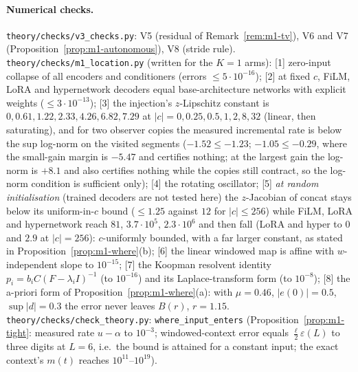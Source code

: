 \paragraph{Numerical checks.}  \texttt{theory/checks/v3\_checks.py}: V5 (residual of
Remark~\ref{rem:m1-tv}), V6 and V7 (Proposition~\ref{prop:m1-autonomous}), V8 (stride rule). \texttt{theory/checks/m1\_location.py}
(written for the $K=1$ arms): [1] zero-input collapse of all encoders and
conditioners (errors $\le5\cdot10^{-16}$); [2] at fixed $c$, FiLM, LoRA and hypernetwork decoders equal base-architecture
networks with explicit weights ($\le3\cdot10^{-13}$); [3] the injection's $z$-Lipschitz constant is $0,0.61,1.22,2.33,4.26,6.82,7.29$ at
$|c|=0,0.25,0.5,1,2,8,32$ (linear, then saturating), and for two observer copies the measured incremental rate is below the
sup log-norm on the visited segments ($-1.52\le-1.23$; $-1.05\le-0.29$, where the small-gain margin is $-5.47$ and certifies
nothing; at the largest gain the log-norm is $+8.1$ and also certifies nothing while the copies still contract, so the
log-norm condition is sufficient only); [4] the rotating oscillator; [5] \emph{at random initialisation} (trained
decoders are not tested here) the $z$-Jacobian of concat stays below its uniform-in-$c$ bound ($\le1.25$ against $12$ for
$|c|\le256$) while FiLM, LoRA and hypernetwork reach $81$, $3.7\cdot10^5$, $2.3\cdot10^6$ and then fall (LoRA and
hyper to $0$ and $2.9$ at $|c|=256$): $c$-uniformly bounded, with a far larger constant, as stated in
Proposition~\ref{prop:m1-where}(b); [6] the linear windowed map is affine with $w$-independent slope to $10^{-15}$;
[7] the Koopman resolvent identity $p_i=b_iC(F-\lambda_iI)^{-1}$ (to $10^{-16}$) and its Laplace-transform form (to
$10^{-8}$); [8] the a-priori form of Proposition~\ref{prop:m1-where}(a): with $\mu=0.46$, $|e(0)|=0.5$, $\sup|d|=0.3$ the
error never leaves $B(r)$, $r=1.15$. \texttt{theory/checks/check\_theory.py}: \texttt{where\_input\_enters}
(Proposition~\ref{prop:m1-tight}: measured rate $u-\alpha$ to $10^{-3}$; windowed-context error equals
$\tfrac{\ell}{2}\varepsilon(L)$ to three digits at $L=6$, i.e.\ the bound is attained for a constant input; the exact
context's $m(t)$ reaches $10^{11}$--$10^{19}$).

